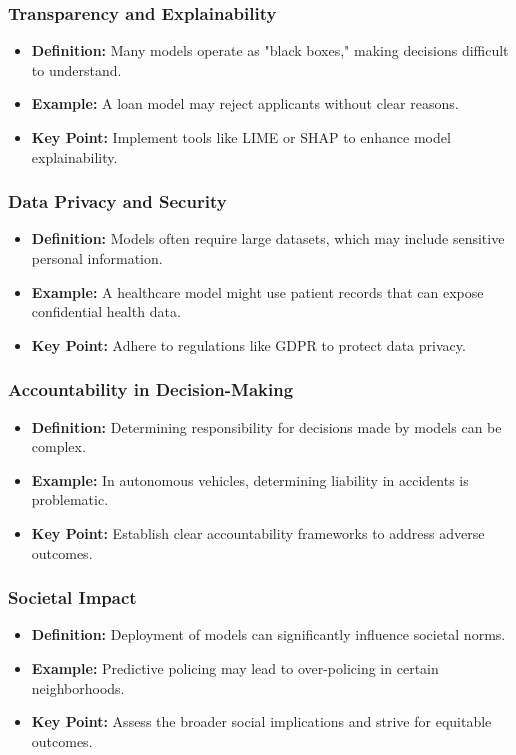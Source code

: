 \documentclass[aspectratio=169]{beamer}
\begin{document}
\begin{frame}[fragile]
    \frametitle{Transparency and Explainability}
    \begin{itemize}
        \item \textbf{Definition:} Many models operate as "black boxes," making decisions difficult to understand.
        \item \textbf{Example:} A loan model may reject applicants without clear reasons.
        \item \textbf{Key Point:} Implement tools like LIME or SHAP to enhance model explainability.
    \end{itemize}
\end{frame}

\begin{frame}[fragile]
    \frametitle{Data Privacy and Security}
    \begin{itemize}
        \item \textbf{Definition:} Models often require large datasets, which may include sensitive personal information.
        \item \textbf{Example:} A healthcare model might use patient records that can expose confidential health data.
        \item \textbf{Key Point:} Adhere to regulations like GDPR to protect data privacy.
    \end{itemize}
\end{frame}

\begin{frame}[fragile]
    \frametitle{Accountability in Decision-Making}
    \begin{itemize}
        \item \textbf{Definition:} Determining responsibility for decisions made by models can be complex.
        \item \textbf{Example:} In autonomous vehicles, determining liability in accidents is problematic.
        \item \textbf{Key Point:} Establish clear accountability frameworks to address adverse outcomes.
    \end{itemize}
\end{frame}

\begin{frame}[fragile]
    \frametitle{Societal Impact}
    \begin{itemize}
        \item \textbf{Definition:} Deployment of models can significantly influence societal norms.
        \item \textbf{Example:} Predictive policing may lead to over-policing in certain neighborhoods.
        \item \textbf{Key Point:} Assess the broader social implications and strive for equitable outcomes.
    \end{itemize}
\end{frame}
\end{document}
